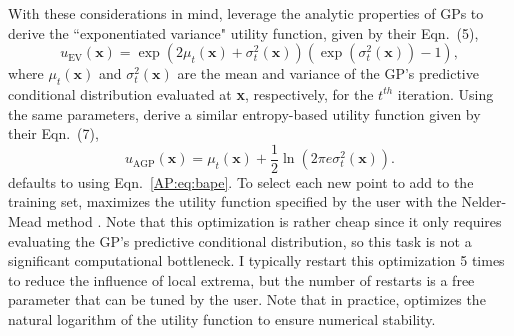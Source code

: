With these considerations in mind, \citet{Kandasamy2017} leverage the analytic properties of GPs to derive the ``exponentiated variance" utility function, given by their Eqn.~(5),
\begin{equation} \label{AP:eq:bape}
    u_{\textrm{EV}}(\textbf{x}) = \exp(2 \mu_t(\textbf{x}) + \sigma_t^2(\textbf{x}))(\exp(\sigma_t^2(\textbf{x})) - 1),
\end{equation}
where $\mu_t(\textbf{x})$ and $\sigma_t^2(\textbf{x})$ are the mean and variance of the GP's predictive conditional distribution evaluated at \textbf{x}, respectively, for the $t^{th}$ \approxposterior iteration. Using the same parameters, \citet{Wang2018} derive a similar entropy-based utility function given by their Eqn.~(7),
\begin{equation} \label{AP:eq:agp}
    u_{\textrm{AGP}}(\textbf{x}) =\mu_t(\textbf{x}) + \frac{1}{2} \ln(2 \pi e \sigma_t^2(\textbf{x})).
\end{equation}
\approxposterior defaults to using Eqn.~\ref{AP:eq:bape}. To select each new point to add to the training set, \approxposterior maximizes the utility function specified by the user with the Nelder-Mead method \citep{Nelder1965}. Note that this optimization is rather cheap since it only requires evaluating the GP's predictive conditional distribution, so this task is not a significant computational bottleneck. I typically restart this optimization 5 times to reduce the influence of local extrema, but the number of restarts is a free parameter that can be tuned by the user.  Note that in practice, \approxposterior optimizes the natural logarithm of the utility function to ensure numerical stability.

